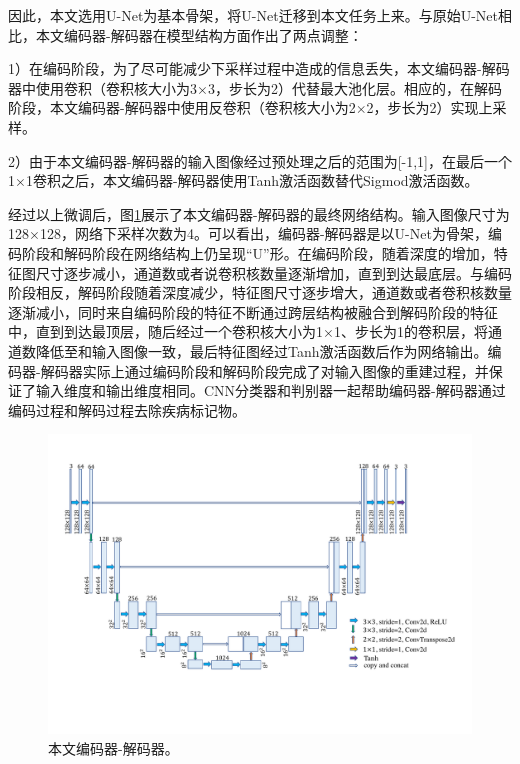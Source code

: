 因此，本文选用U-Net为基本骨架，将U-Net迁移到本文任务上来。与原始U-Net相比，本文编码器-解码器在模型结构方面作出了两点调整：

1）在编码阶段，为了尽可能减少下采样过程中造成的信息丢失，本文编码器-解码器中使用卷积（卷积核大小为3$\times$3，步长为2）代替最大池化层。相应的，在解码阶段，本文编码器-解码器中使用反卷积（卷积核大小为2$\times$2，步长为2）实现上采样。

2）由于本文编码器-解码器的输入图像经过预处理之后的范围为[-1,1]，在最后一个1$\times$1卷积之后，本文编码器-解码器使用Tanh激活函数替代Sigmod激活函数。

经过以上微调后，图\ref{fig:auto_encoder_architecture}展示了本文编码器-解码器的最终网络结构。输入图像尺寸为128$\times$128，网络下采样次数为4。可以看出，编码器-解码器是以U-Net为骨架，编码阶段和解码阶段在网络结构上仍呈现“U”形。在编码阶段，随着深度的增加，特征图尺寸逐步减小，通道数或者说卷积核数量逐渐增加，直到到达最底层。与编码阶段相反，解码阶段随着深度减少，特征图尺寸逐步增大，通道数或者卷积核数量逐渐减小，同时来自编码阶段的特征不断通过跨层结构被融合到解码阶段的特征中，直到到达最顶层，随后经过一个卷积核大小为1$\times$1、步长为1的卷积层，将通道数降低至和输入图像一致，最后特征图经过Tanh激活函数后作为网络输出。编码器-解码器实际上通过编码阶段和解码阶段完成了对输入图像的重建过程，并保证了输入维度和输出维度相同。CNN分类器和判别器一起帮助编码器-解码器通过编码过程和解码过程去除疾病标记物。
\begin{figure}[h]
	\centering
	\includegraphics[width=1.0\textwidth]{figure/auto_encoder_architecture}
	\caption[本文编码器-解码器]{本文编码器-解码器。}
	\label{fig:auto_encoder_architecture}
\end{figure}
\vspace{-0.7cm}
